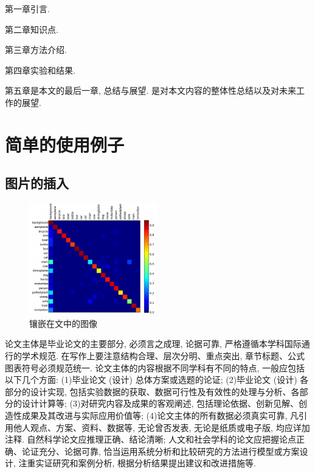 \documentclass[a4paper]{article}
\begin{document}
\begin{spacing}{1.5}
第一章引言.

第二章知识点.

第三章方法介绍.

第四章实验和结果.

第五章是本文的最后一章, 总结与展望. 是对本文内容的整体性总结以及对未来工作的展望.

\pagebreak[4]

\section{简单的使用例子}
\label{cha:example}
\subsection{图片的插入}
\label{sec:Images}
\begin{figure}
\centering
\includegraphics[width=0.5\textwidth]{images/Chap2/confusion.pdf} %
\caption{镶嵌在文中的图像}
\label{fig:confusion}
\end{figure}
论文主体是毕业论文的主要部分, 必须言之成理, 论据可靠, 严格遵循本学科国际通行的学术规范. 在写作上要注意结构合理、层次分明、重点突出, 章节标题、公式图表符号必须规范统一. 论文主体的内容根据不同学科有不同的特点, 一般应包括以下几个方面: (1)毕业论文 (设计) 总体方案或选题的论证; (2)毕业论文 (设计) 各部分的设计实现, 包括实验数据的获取、数据可行性及有效性的处理与分析、各部分的设计计算等; (3)对研究内容及成果的客观阐述, 包括理论依据、创新见解、创造性成果及其改进与实际应用价值等; (4)论文主体的所有数据必须真实可靠, 凡引用他人观点、方案、资料、数据等, 无论曾否发表, 无论是纸质或电子版, 均应详加注释. 自然科学论文应推理正确、结论清晰; 人文和社会学科的论文应把握论点正确、论证充分、论据可靠, 恰当运用系统分析和比较研究的方法进行模型或方案设计, 注重实证研究和案例分析, 根据分析结果提出建议和改进措施等.


\end{spacing}
\end{document}
